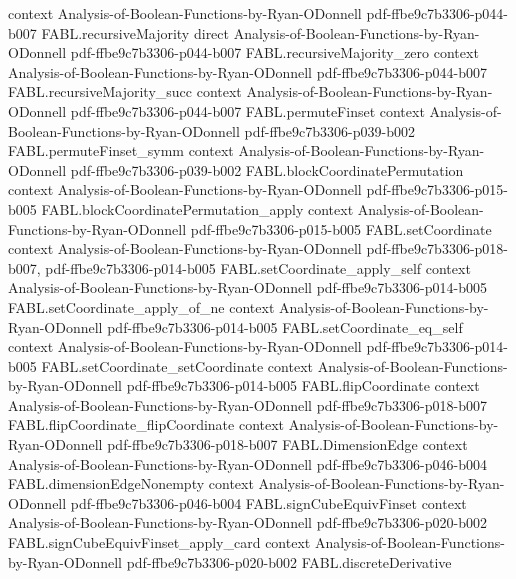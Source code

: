 \begin{theorem}
  {context}
  {Analysis-of-Boolean-Functions-by-Ryan-ODonnell}
  {pdf-ffbe9c7b3306-p044-b007}
\proofstep
  {FABL.recursiveMajority}
  {direct}
  {Analysis-of-Boolean-Functions-by-Ryan-ODonnell}
  {pdf-ffbe9c7b3306-p044-b007}
\proofstep
  {FABL.recursiveMajority_zero}
  {context}
  {Analysis-of-Boolean-Functions-by-Ryan-ODonnell}
  {pdf-ffbe9c7b3306-p044-b007}
\proofstep
  {FABL.recursiveMajority_succ}
  {context}
  {Analysis-of-Boolean-Functions-by-Ryan-ODonnell}
  {pdf-ffbe9c7b3306-p044-b007}
\proofstep
  {FABL.permuteFinset}
  {context}
  {Analysis-of-Boolean-Functions-by-Ryan-ODonnell}
  {pdf-ffbe9c7b3306-p039-b002}
\proofstep
  {FABL.permuteFinset_symm}
  {context}
  {Analysis-of-Boolean-Functions-by-Ryan-ODonnell}
  {pdf-ffbe9c7b3306-p039-b002}
\proofstep
  {FABL.blockCoordinatePermutation}
  {context}
  {Analysis-of-Boolean-Functions-by-Ryan-ODonnell}
  {pdf-ffbe9c7b3306-p015-b005}
\proofstep
  {FABL.blockCoordinatePermutation_apply}
  {context}
  {Analysis-of-Boolean-Functions-by-Ryan-ODonnell}
  {pdf-ffbe9c7b3306-p015-b005}
\proofstep
  {FABL.setCoordinate}
  {context}
  {Analysis-of-Boolean-Functions-by-Ryan-ODonnell}
  {pdf-ffbe9c7b3306-p018-b007,
    pdf-ffbe9c7b3306-p014-b005}
\proofstep
  {FABL.setCoordinate_apply_self}
  {context}
  {Analysis-of-Boolean-Functions-by-Ryan-ODonnell}
  {pdf-ffbe9c7b3306-p014-b005}
\proofstep
  {FABL.setCoordinate_apply_of_ne}
  {context}
  {Analysis-of-Boolean-Functions-by-Ryan-ODonnell}
  {pdf-ffbe9c7b3306-p014-b005}
\proofstep
  {FABL.setCoordinate_eq_self}
  {context}
  {Analysis-of-Boolean-Functions-by-Ryan-ODonnell}
  {pdf-ffbe9c7b3306-p014-b005}
\proofstep
  {FABL.setCoordinate_setCoordinate}
  {context}
  {Analysis-of-Boolean-Functions-by-Ryan-ODonnell}
  {pdf-ffbe9c7b3306-p014-b005}
\proofstep
  {FABL.flipCoordinate}
  {context}
  {Analysis-of-Boolean-Functions-by-Ryan-ODonnell}
  {pdf-ffbe9c7b3306-p018-b007}
\proofstep
  {FABL.flipCoordinate_flipCoordinate}
  {context}
  {Analysis-of-Boolean-Functions-by-Ryan-ODonnell}
  {pdf-ffbe9c7b3306-p018-b007}
\proofstep
  {FABL.DimensionEdge}
  {context}
  {Analysis-of-Boolean-Functions-by-Ryan-ODonnell}
  {pdf-ffbe9c7b3306-p046-b004}
\proofstep
  {FABL.dimensionEdgeNonempty}
  {context}
  {Analysis-of-Boolean-Functions-by-Ryan-ODonnell}
  {pdf-ffbe9c7b3306-p046-b004}
\proofstep
  {FABL.signCubeEquivFinset}
  {context}
  {Analysis-of-Boolean-Functions-by-Ryan-ODonnell}
  {pdf-ffbe9c7b3306-p020-b002}
\proofstep
  {FABL.signCubeEquivFinset_apply_card}
  {context}
  {Analysis-of-Boolean-Functions-by-Ryan-ODonnell}
  {pdf-ffbe9c7b3306-p020-b002}
\proofstep
  {FABL.discreteDerivative}

\end{theorem}
